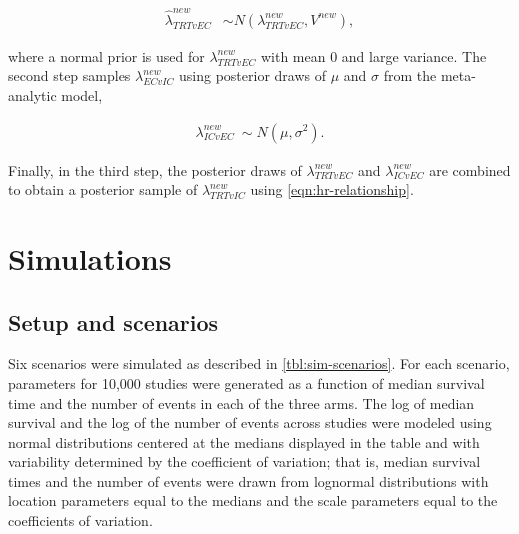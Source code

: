 \documentclass[11pt,final,fleqn]{article}\usepackage[]{graphicx}\usepackage[]{color}
\begin{document}
\begin{align}
\hat{\lambda}_{TRTvEC}^{new} &\sim N(\lambda_{TRTvEC}^{new}, V^{new}),
\end{align}

where a normal prior is used for $\lambda_{TRTvEC}^{new}$ with mean $0$ and large variance. The second step samples $\lambda_{ECvIC}^{new}$ using posterior draws of $\mu$ and $\sigma$ from the meta-analytic model,

\begin{align}
\lambda_{ICvEC}^{new} ~ \sim N ( \mu , \sigma^2).
\end{align}

Finally, in the third step, the posterior draws of $\lambda_{TRTvEC}^{new}$ and $\lambda_{ICvEC}^{new}$ are combined to obtain a posterior sample of $\lambda_{TRTvIC}^{new}$ using \autoref{eqn:hr-relationship}.


\section{Simulations} \label{sec:simulations}

\subsection{Setup and scenarios}
Six scenarios were simulated as described in \autoref{tbl:sim-scenarios}. For each scenario, parameters for 10,000 studies were generated as a function of median survival time and the number of events in each of the three arms. The log of median survival and the log of the number of events across studies were modeled using normal distributions centered at the medians displayed in the table and with variability determined by the coefficient of variation; that is, median survival times and the number of events were drawn from lognormal distributions with location parameters equal to the medians and the scale parameters equal to the coefficients of variation.
\end{document}
